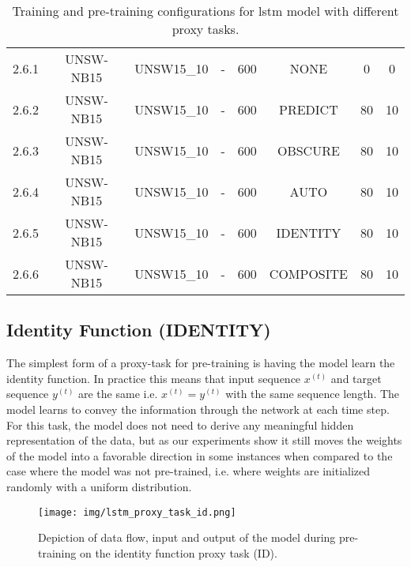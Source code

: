 \begin{table}[h]
{\begin{tabular}{cccccccc}
		2.6.1 \label{ex_2_6_1} & UNSW-NB15    & UNSW15\_10 & -           & 600           & NONE       & 0         & 0           \\
		2.6.2 \label{ex_2_6_2} & UNSW-NB15    & UNSW15\_10 & -           & 600           & PREDICT    & 80        & 10          \\
		2.6.3 \label{ex_2_6_3} & UNSW-NB15    & UNSW15\_10 & -           & 600           & OBSCURE      & 80        & 10          \\
		2.6.4 \label{ex_2_6_4} & UNSW-NB15    & UNSW15\_10 & -           & 600           & AUTO       & 80        & 10          \\
		2.6.5 \label{ex_2_6_5} & UNSW-NB15    & UNSW15\_10 & -           & 600           & IDENTITY   & 80        & 10          \\
		2.6.6 \label{ex_2_6_6} & UNSW-NB15    & UNSW15\_10 & -           & 600           & COMPOSITE  & 80        & 10         
	\end{tabular}}
	\caption{Training and pre-training configurations for \gls{lstm} model with different proxy tasks.}
	\label{table:experiments:lstm:configurations}
\end{table}

\subsection{Identity Function (IDENTITY)} \label{sec:experiments:lstm:identity}

The simplest form of a proxy-task for pre-training is having the model learn the identity function. In practice this means that input sequence $x^{(t)}$ and target sequence $y^{(t)}$ are the same i.e. $x^{(t)} = y^{(t)}$ with the same sequence length. The model learns to convey the information through the network at each time step. For this task, the model does not need to derive any meaningful hidden representation of the data, but as our experiments show it still moves the weights of the model into a favorable direction in some instances when compared to the case where the model was not pre-trained, i.e. where weights are initialized randomly with a uniform distribution.

\begin{figure}[h]
	\centering
	\texttt{[image: img/lstm\_proxy\_task\_id.png]}
	\caption{Depiction of data flow, input and output of the model during pre-training on the identity function proxy task (ID).}
	\label{fig:experiments:lstm_proxy_task_id}
\end{figure}

